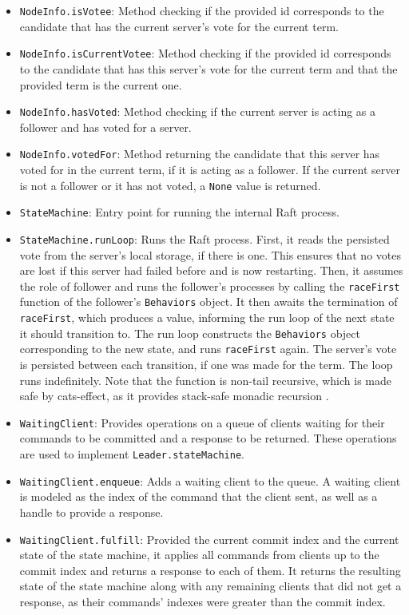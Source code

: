 \begin{itemize}
    \item \lstinline|NodeInfo.isVotee|: Method checking if the provided id corresponds to the candidate that has the current server's vote for the current term.
    \item \lstinline|NodeInfo.isCurrentVotee|: Method checking if the provided id corresponds to the candidate that has this server's vote for the current term and that the provided term is the current one.
    \item \lstinline|NodeInfo.hasVoted|: Method checking if the current server is acting as a follower and has voted for a server.
    \item \lstinline|NodeInfo.votedFor|: Method returning the candidate that this server has voted for in the current term, if it is acting as a follower. If the current server is not a follower or it has not voted, a \lstinline|None| value is returned.
    \item \lstinline|StateMachine|: Entry point for running the internal Raft process.
    \item \lstinline|StateMachine.runLoop|: Runs the Raft process. First, it reads the persisted vote from the server's local storage, if there is one. This ensures that no votes are lost if this server had failed before and is now restarting. Then, it assumes the role of follower and runs the follower's processes by calling the \lstinline|raceFirst| function of the follower's \lstinline|Behaviors| object. It then awaits the termination of \lstinline|raceFirst|, which produces a value, informing the run loop of the next state it should transition to. The run loop constructs the \lstinline|Behaviors| object corresponding to the new state, and runs \lstinline|raceFirst| again. The server's vote is persisted between each transition, if one was made for the term. The loop runs indefinitely. Note that the function is non-tail recursive, which is made safe by cats-effect, as it provides stack-safe monadic recursion \cite{freeman2015stack}.
    \item \lstinline|WaitingClient|: Provides operations on a queue of clients waiting for their commands to be committed and a response to be returned. These operations are used to implement \lstinline|Leader.stateMachine|.
    \item \lstinline|WaitingClient.enqueue|: Adds a waiting client to the queue. A waiting client is modeled as the index of the command that the client sent, as well as a handle to provide a response.
    \item \lstinline|WaitingClient.fulfill|: Provided the current commit index and the current state of the state machine, it applies all commands from clients up to the commit index and returns a response to each of them. It returns the resulting state of the state machine along with any remaining clients that did not get a response, as their commands' indexes were greater than the commit index.

\end{itemize}
